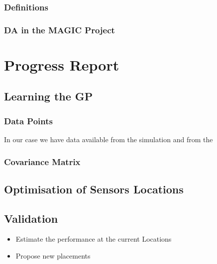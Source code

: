 \documentclass[11pt,a4paper]{article}
\numberwithin{equation}{section}
\begin{document}
\subsubsection{Definitions}

\subsubsection{DA in the MAGIC Project}


\pagebreak
\section{Progress Report}

\subsection{Learning the GP}
\subsubsection{Data Points}
In our case we have data available from the simulation and from the 

\subsubsection{Covariance Matrix}


\subsection{Optimisation of Sensors Locations}

\subsection{Validation}

\begin{itemize}
	\item Estimate the performance at the current Locations
	\item Propose new placements 
\end{itemize}

\pagebreak


\end{document}
